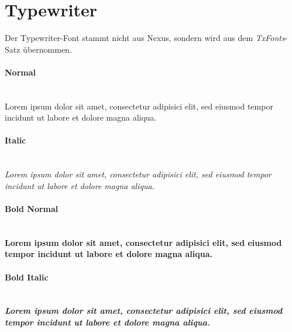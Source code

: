 \section*{Typewriter}

Der Typewriter-Font stammt nicht aus Nexus, sondern wird aus dem
\emph{TxFonts}-Satz übernommen.

\paragraph{Normal}\hfill\\
{\ttfamily
Lorem ipsum dolor sit amet, consectetur adipisici elit, sed eiusmod tempor
incidunt ut labore et dolore magna aliqua.
}

\paragraph{Italic}\hfill\\
{\ttfamily\itshape%
Lorem ipsum dolor sit amet, consectetur adipisici elit, sed eiusmod tempor
incidunt ut labore et dolore magna aliqua.
}


\paragraph{Bold Normal}\hfill\\
{\ttfamily\bfseries%
Lorem ipsum dolor sit amet, consectetur adipisici elit, sed eiusmod tempor
incidunt ut labore et dolore magna aliqua.
}

\paragraph{Bold Italic}\hfill\\
{\ttfamily\bfseries\itshape%
Lorem ipsum dolor sit amet, consectetur adipisici elit, sed eiusmod tempor
incidunt ut labore et dolore magna aliqua.
}
